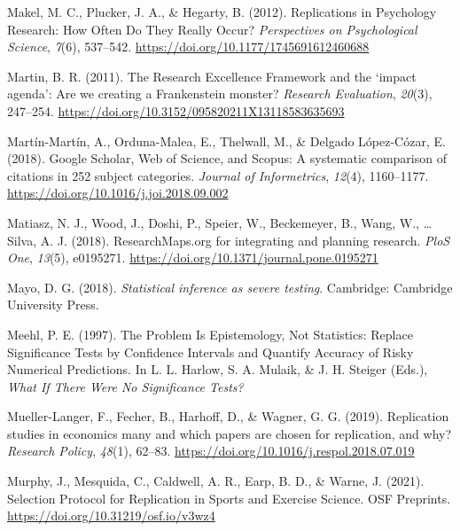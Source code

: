 \documentclass[
  english,
  jou,floatsintext]{apa6}
\newlength{\cslhangindent}
\newlength{\cslentryspacingunit} %
\newenvironment{CSLReferences}[2] %
 {%
  \setlength{\parindent}{0pt}
  \ifodd #1
  \let\oldpar\par
  \def\par{\hangindent=\cslhangindent\oldpar}
  \fi
  \setlength{\parskip}{#2\cslentryspacingunit}
 }%
 {}
\begin{document}
\begin{CSLReferences}{1}{0}
\leavevmode{}%
Makel, M. C., Plucker, J. A., \& Hegarty, B. (2012). Replications in {Psychology Research}: {How Often Do They Really Occur}? \emph{Perspectives on Psychological Science}, \emph{7}(6), 537--542. \url{https://doi.org/10.1177/1745691612460688}

\leavevmode{}%
Martin, B. R. (2011). The {Research Excellence Framework} and the {`impact agenda'}: Are we creating a {Frankenstein} monster? \emph{Research Evaluation}, \emph{20}(3), 247--254. \url{https://doi.org/10.3152/095820211X13118583635693}

\leavevmode{}%
Martín-Martín, A., Orduna-Malea, E., Thelwall, M., \& Delgado López-Cózar, E. (2018). Google {Scholar}, {Web} of {Science}, and {Scopus}: {A} systematic comparison of citations in 252 subject categories. \emph{Journal of Informetrics}, \emph{12}(4), 1160--1177. \url{https://doi.org/10.1016/j.joi.2018.09.002}

\leavevmode{}%
Matiasz, N. J., Wood, J., Doshi, P., Speier, W., Beckemeyer, B., Wang, W., \ldots{} Silva, A. J. (2018). {ResearchMaps}.org for integrating and planning research. \emph{PloS One}, \emph{13}(5), e0195271. \url{https://doi.org/10.1371/journal.pone.0195271}

\leavevmode{}%
Mayo, D. G. (2018). \emph{Statistical inference as severe testing}. {Cambridge: Cambridge University Press}.

\leavevmode{}%
Meehl, P. E. (1997). The {Problem Is Epistemology}, {Not Statistics}: {Replace Significance Tests} by {Confidence Intervals} and {Quantify Accuracy} of {Risky Numerical Predictions}. In L. L. Harlow, S. A. Mulaik, \& J. H. Steiger (Eds.), \emph{What {If There Were No Significance Tests}?}

\leavevmode{}%
Mueller-Langer, F., Fecher, B., Harhoff, D., \& Wagner, G. G. (2019). Replication studies in economics many and which papers are chosen for replication, and why? \emph{Research Policy}, \emph{48}(1), 62--83. \url{https://doi.org/10.1016/j.respol.2018.07.019}

\leavevmode{}%
Murphy, J., Mesquida, C., Caldwell, A. R., Earp, B. D., \& Warne, J. (2021). Selection {Protocol} for {Replication} in {Sports} and {Exercise Science}. {OSF Preprints}. \url{https://doi.org/10.31219/osf.io/v3wz4}


\end{CSLReferences}
\end{document}
